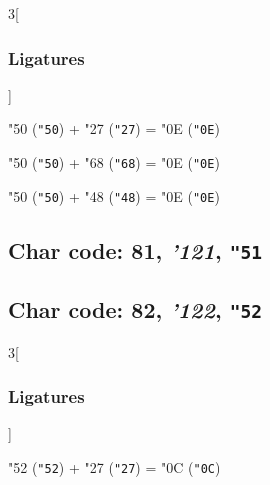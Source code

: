 \documentclass{article}
\newlength{\maxcharwidth}
\begin{document}
\begin{multicols}{3}[\subsubsection{Ligatures}]

{\testfont\char"50\noboundary} ({\tt"50}) + {\testfont\char"27\noboundary} ({\tt"27}) = {\testfont\char"0E\noboundary} ({\tt"0E}) 

{\testfont\char"50\noboundary} ({\tt"50}) + {\testfont\char"68\noboundary} ({\tt"68}) = {\testfont\char"0E\noboundary} ({\tt"0E}) 

{\testfont\char"50\noboundary} ({\tt"50}) + {\testfont\char"48\noboundary} ({\tt"48}) = {\testfont\char"0E\noboundary} ({\tt"0E}) 

\end{multicols}

\subsection{Char code: 81, {\it'121}, {\tt"51}}
\label{char_81}


\subsection{Char code: 82, {\it'122}, {\tt"52}}
\label{char_82}


\begin{multicols}{3}[\subsubsection{Ligatures}]

{\testfont\char"52\noboundary} ({\tt"52}) + {\testfont\char"27\noboundary} ({\tt"27}) = {\testfont\char"0C\noboundary} ({\tt"0C}) 

\end{multicols}
\end{document}
